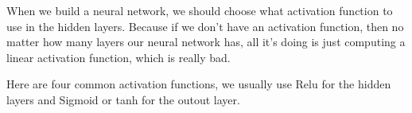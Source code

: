 \documentclass[a4paper]{article}
\begin{document}
When we build a neural network, we should choose what activation function to use in the hidden layers. Because if we don't have an activation function, then no matter how many layers our neural network has, all it's doing is just computing a linear activation function, which is really bad.

Here are four common activation functions, we usually use Relu for the hidden layers and Sigmoid or tanh for the outout layer.

\begin{figure}[htbp]
\centering

%
%
 

%
%

\centering
\end{figure}
\end{document}
